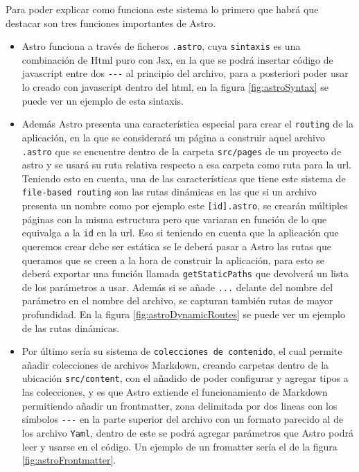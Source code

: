 Para poder explicar como funciona este sistema lo primero que habrá que destacar son tres funciones importantes de Astro.
\begin{itemize}
    \item Astro funciona a través de ficheros \verb|.astro|, cuya \verb|sintaxis|\cite{astro-syntax} es una combinación de Html puro con Jsx, en la que se podrá insertar código de javascript entre dos \verb|---| al principio del archivo, para a posteriori poder usar lo creado con javascript dentro del html, en la figura \ref{fig:astroSyntax} se puede ver un ejemplo de esta sintaxis.
    \item Además Astro presenta una característica especial para crear el \verb|routing|\cite{astro-routing} de la aplicación, en la que se considerará un página a construir aquel archivo \verb|.astro| que se encuentre dentro de la carpeta \verb|src/pages| de un proyecto de astro y se usará su ruta relativa respecto a esa carpeta como ruta para la url. Teniendo esto en cuenta, una de las características que tiene este sistema de \verb|file-based routing| son las rutas dinámicas en las que si un archivo presenta un nombre como por ejemplo este \verb|[id].astro|, se crearán múltiples páginas con la misma estructura pero que variaran en función de lo que equivalga a la \verb|id| en la url. Eso si teniendo en cuenta que la aplicación que queremos crear debe ser estática se le deberá pasar a Astro las rutas que queramos que se creen a la hora de construir la aplicación, para esto se deberá exportar una función llamada \verb|getStaticPaths| que devolverá un lista de los parámetros a usar. Además si se añade \verb|...| delante del nombre del parámetro en el nombre del archivo, se capturan también rutas de mayor profundidad. En la figura \ref{fig:astroDynamicRoutes} se puede ver un ejemplo de las rutas dinámicas.
    \item Por último sería su sistema de \verb|colecciones de contenido|\cite{astro-collections}, el cual permite añadir colecciones de archivos Markdown, creando carpetas dentro de la ubicación \verb|src/content|, con el añadido de poder configurar y agregar tipos a las colecciones, y es que Astro extiende el funcionamiento de Markdown permitiendo añadir un frontmatter, zona delimitada por dos lineas con los símbolos \verb|---| en la parte superior del archivo con un formato parecido al de los archivo \verb|Yaml|\cite{yaml}, dentro de este se podrá agregar parámetros que Astro podrá leer y usarse en el código. Un ejemplo de un fromatter sería el de la figura \ref{fig:astroFrontmatter}.
\end{itemize}
 

